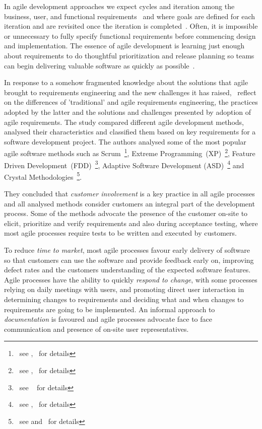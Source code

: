 \documentclass[dissertation,final]{softeng}
\begin{document}
In agile development approaches we expect cycles and iteration among the business, user, and functional requirements~\citep{Wiegers2013} and where goals are defined for each iteration and are revisited once the iteration is completed~\citep{Inayat2015}. Often, it is impossible or unnecessary to fully specify functional requirements before commencing design and implementation. The essence of agile development is learning just enough about requirements to do thoughtful prioritization and release planning so teams can begin delivering valuable software as quickly as possible~\citep{Wiegers2013}.

In response to a somehow fragmented knowledge about the solutions that agile brought to requirements engineering and the new challenges it has raised,~\citet{Qasaimeh2008} reflect on the differences of 'traditional' and agile requirements engineering, the practices adopted by the latter and the solutions and challenges presented by adoption of agile requirements. The study compared different agile development methods, analysed their characteristics and classified them based on key requirements for a software development project. The authors analysed some of the most popular agile software methods such as Scrum~\footnote{~see ,~ \citet{Schwaber:2001:ASD:559553} for details}, Extreme Programming~(XP)~\footnote{~see ,~ \citet{Beck:1999:EPE:318762} for details}, Feature Driven Development~(FDD)~\footnote{~see ~\citet{Palmer:2001:PGF:600044} for details}, Adaptive Software Development (ASD)~\footnote{~see ,~ \citet{Highsmith:2000:ASD:323922} for details} and Crystal Methodologies~\footnote{~see  and~ \citet{CockburnCrystal2004} for details}.

They concluded that \emph{customer involvement} is a key practice in all agile processes and all analysed methods consider customers an integral part of the development process. Some of the methods advocate the presence of the customer on-site to elicit, prioritize and verify requirements and also during acceptance testing, where most agile processes require tests to be written and executed by customers.

To reduce \emph{time to market}, most agile processes favour early delivery of software so that customers can use the software and provide feedback early on, improving defect rates and the customers understanding of the expected software features. Agile processes have the ability to quickly \emph{respond to change}, with some processes relying on daily meetings with users, and promoting direct user interaction in determining changes to requirements and deciding what and when changes to requirements are going to be implemented. An informal approach to \emph{documentation} is favoured and agile processes advocate face to face communication and presence of on-site user representatives.
\end{document}
